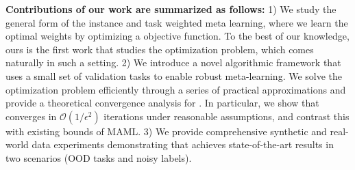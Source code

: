 \noindent \textbf{Contributions of our work are summarized as follows:} 
1) We study the general form of the instance and task weighted meta learning, where we learn the optimal weights by optimizing a \textit{\biopt{}} objective function. To the best of our knowledge, ours is the first work that studies the \textit{\biopt{}} optimization problem, which comes naturally in such a setting. 2) We introduce a novel algorithmic framework \sysname{} that uses a small set of validation tasks to enable robust meta-learning. We solve the \emph{\biopt{}} optimization problem efficiently through a series of practical approximations and provide a theoretical convergence analysis for \sysname{}. In particular, we show that \sysname{} converges in $\mathcal{O}(1/\epsilon^2)$ iterations under reasonable assumptions, and contrast this with existing bounds of MAML. 3) We provide comprehensive synthetic and real-world data experiments demonstrating that \sysname{} achieves state-of-the-art results in two scenarios (OOD tasks and noisy labels).

\vspace{-1ex}
